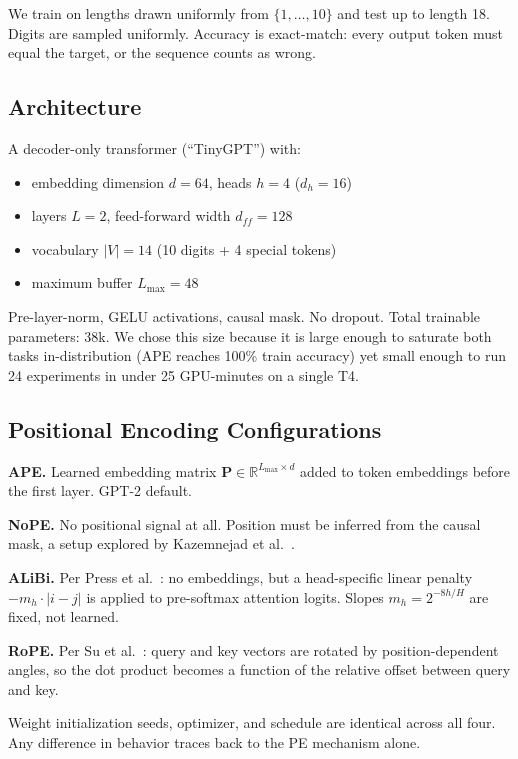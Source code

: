 \documentclass[10pt,twocolumn]{article}
\begin{document}
We train on lengths drawn uniformly from $\{1, \ldots, 10\}$ and test up to length 18.
Digits are sampled uniformly.
Accuracy is exact-match: every output token must equal the target, or the sequence counts as wrong.

\subsection{Architecture}
\label{sec:arch}

A decoder-only transformer (``TinyGPT'') with:
\begin{itemize}
  \item embedding dimension $d = 64$, heads $h = 4$ ($d_h = 16$)
  \item layers $L = 2$, feed-forward width $d_{ff} = 128$
  \item vocabulary $|V| = 14$ (10 digits + 4 special tokens)
  \item maximum buffer $L_{\max} = 48$
\end{itemize}
Pre-layer-norm, GELU activations, causal mask. No dropout.
Total trainable parameters: 38k.
We chose this size because it is large enough to saturate both tasks in-distribution (APE reaches 100\% train accuracy) yet small enough to run 24 experiments in under 25 GPU-minutes on a single T4.

\subsection{Positional Encoding Configurations}
\label{sec:pe}

\textbf{APE.}\quad
Learned embedding matrix $\mathbf{P} \in \mathbb{R}^{L_{\max} \times d}$ added to token embeddings before the first layer.  GPT-2 default.

\textbf{NoPE.}\quad
No positional signal at all.  Position must be inferred from the causal mask, a setup explored by Kazemnejad et al.~\cite{kazemnejad2023impact}.

\textbf{ALiBi.}\quad
Per Press et al.~\cite{press2022alibi}: no embeddings, but a head-specific linear penalty $-m_h \cdot |i - j|$ is applied to pre-softmax attention logits.
Slopes $m_h = 2^{-8h/H}$ are fixed, not learned.

\textbf{RoPE.}\quad
Per Su et al.~\cite{su2024roformer}: query and key vectors are rotated by position-dependent angles, so the dot product becomes a function of the relative offset between query and key.

Weight initialization seeds, optimizer, and schedule are identical across all four.
Any difference in behavior traces back to the PE mechanism alone.
\end{document}
